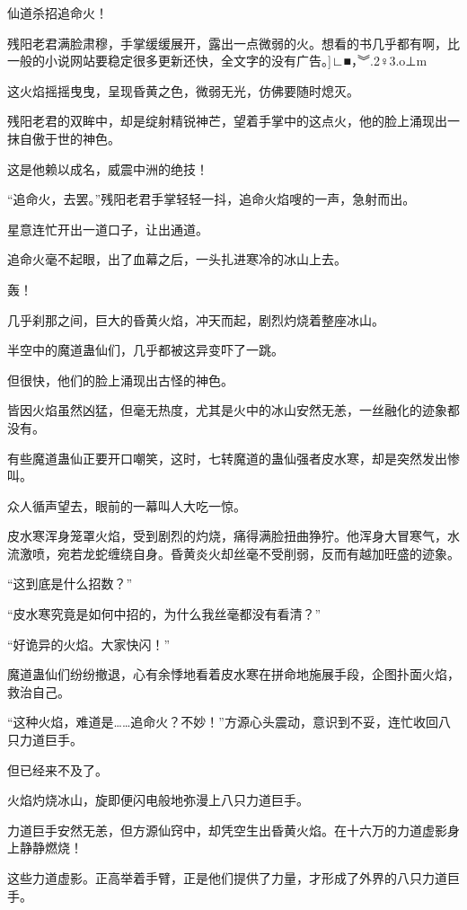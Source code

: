
\begin{this_body}

仙道杀招追命火！

残阳老君满脸肃穆，手掌缓缓展开，露出一点微弱的火。想看的书几乎都有啊，比一般的小说网站要稳定很多更新还快，全文字的没有广告。]∟■，︾.2♀3.o⊥m

这火焰摇摇曳曳，呈现昏黄之色，微弱无光，仿佛要随时熄灭。

残阳老君的双眸中，却是绽射精锐神芒，望着手掌中的这点火，他的脸上涌现出一抹自傲于世的神色。

这是他赖以成名，威震中洲的绝技！

“追命火，去罢。”残阳老君手掌轻轻一抖，追命火焰嗖的一声，急射而出。

星意连忙开出一道口子，让出通道。

追命火毫不起眼，出了血幕之后，一头扎进寒冷的冰山上去。

轰！

几乎刹那之间，巨大的昏黄火焰，冲天而起，剧烈灼烧着整座冰山。

半空中的魔道蛊仙们，几乎都被这异变吓了一跳。

但很快，他们的脸上涌现出古怪的神色。

皆因火焰虽然凶猛，但毫无热度，尤其是火中的冰山安然无恙，一丝融化的迹象都没有。

有些魔道蛊仙正要开口嘲笑，这时，七转魔道的蛊仙强者皮水寒，却是突然发出惨叫。

众人循声望去，眼前的一幕叫人大吃一惊。

皮水寒浑身笼罩火焰，受到剧烈的灼烧，痛得满脸扭曲狰狞。他浑身大冒寒气，水流激喷，宛若龙蛇缠绕自身。昏黄炎火却丝毫不受削弱，反而有越加旺盛的迹象。

“这到底是什么招数？”

“皮水寒究竟是如何中招的，为什么我丝毫都没有看清？”

“好诡异的火焰。大家快闪！”

魔道蛊仙们纷纷撤退，心有余悸地看着皮水寒在拼命地施展手段，企图扑面火焰，救治自己。

“这种火焰，难道是……追命火？不妙！”方源心头震动，意识到不妥，连忙收回八只力道巨手。

但已经来不及了。

火焰灼烧冰山，旋即便闪电般地弥漫上八只力道巨手。

力道巨手安然无恙，但方源仙窍中，却凭空生出昏黄火焰。在十六万的力道虚影身上静静燃烧！

这些力道虚影。正高举着手臂，正是他们提供了力量，才形成了外界的八只力道巨手。


\end{this_body}
